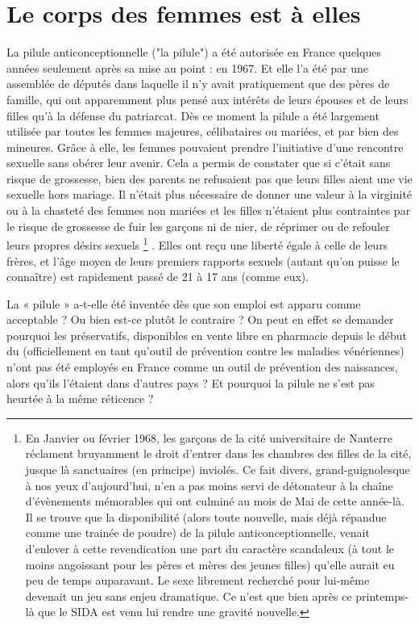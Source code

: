  \section{Le corps des femmes est à elles}


 La pilule anticonceptionnelle ("la pilule") a été autorisée en France quelques années seulement après sa mise au point : en 1967. Et elle l'a été par une assemblée de députés dans laquelle il n'y avait pratiquement que des pères de famille, qui ont apparemment plus pensé aux intérêts de leurs épouses et de leurs filles qu'à la défense du patriarcat. Dès ce moment la pilule a été largement utilisée par toutes les femmes majeures, célibataires ou mariées, et par bien des mineures. Grâce à elle, les femmes pouvaient prendre l'initiative d'une rencontre sexuelle sans obérer leur avenir. Cela a permis de constater que si c'était sans risque de grossesse, bien des parents ne refusaient pas que leurs filles aient une vie sexuelle hors mariage. Il n'était plus nécessaire de donner une valeur à la virginité ou à la chasteté des femmes non mariées et les filles n'étaient plus contraintes par le risque de grossesse de fuir les garçons ni de nier, de réprimer ou de refouler leurs propres désirs sexuels
\footnote{En Janvier ou février 1968, les garçons de la cité universitaire de Nanterre réclament bruyamment le droit d'entrer dans les chambres des filles de la cité, jusque là sanctuaires (en principe) inviolés. Ce fait divers, grand-guignolesque à nos yeux d'aujourd'hui, n'en a pas moins servi de détonateur à la chaîne d'évènements mémorables qui ont culminé au mois de Mai de cette année-là. Il se trouve que la disponibilité (alors toute nouvelle, mais déjà répandue comme une trainée de poudre) de la pilule anticonceptionnelle, venait d'enlever à cette revendication une part du caractère scandaleux (à tout le moins angoissant pour les pères et mères des jeunes filles) qu'elle aurait eu peu de temps auparavant. Le sexe librement recherché pour lui-même devenait un jeu sans enjeu dramatique. Ce n'est que bien après ce printemps-là que le SIDA est venu lui rendre une gravité nouvelle.}%
. Elles ont reçu une liberté égale à celle de leurs frères, et l'âge moyen de leurs premiers rapports sexuels (autant qu'on puisse le connaître) est rapidement passé de 21 à 17 ans (comme eux).

 La « pilule » a-t-elle été inventée dès que son emploi est apparu comme acceptable ? Ou bien est-ce plutôt le contraire ? On peut en effet se demander pourquoi les préservatifs, disponibles en vente libre en pharmacie depuis le début du  (officiellement en tant qu'outil de prévention contre les maladies vénériennes) n'ont pas été employés en France comme un outil de prévention des naissances, alors qu'ils l'étaient dans d'autres pays ? Et pourquoi la pilule ne s'est pas heurtée à la même réticence ? 


